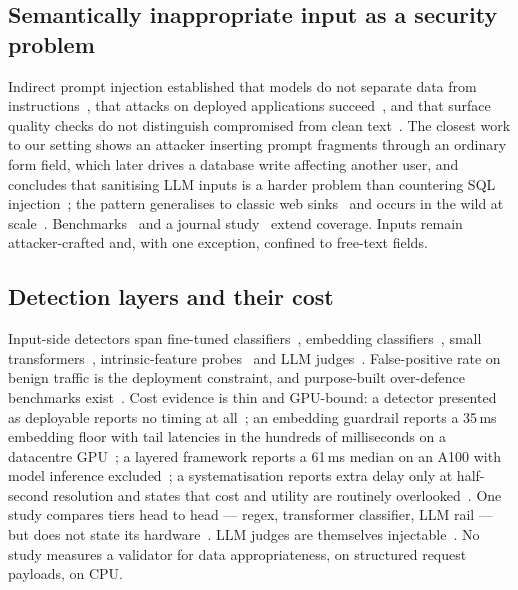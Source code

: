 \documentclass[conference]{IEEEtran}
\begin{document}
\subsection{Semantically inappropriate input as a security problem}
Indirect prompt injection established that models do not separate data from
instructions~\cite{greshake2023indirect}, that attacks on deployed applications
succeed~\cite{liu2023houyi,kaya2026chatbotplugins}, and that surface quality checks do not
distinguish compromised from clean text~\cite{liu2024formalizing}. The closest work to our setting
shows an attacker inserting prompt fragments through an ordinary form field, which later drives a
database write affecting another user, and concludes that sanitising LLM inputs is a harder problem
than countering SQL injection~\cite{pedro2025p2sql}; the pattern generalises to classic web
sinks~\cite{tsigkopoulos2026webexploitation} and occurs in the wild at
scale~\cite{khodayari2026ipiwild}. Benchmarks~\cite{yi2025bipia,evtimov2025wasp,liu2025wainjectbench}
and a journal study~\cite{milani2026ipi} extend coverage. Inputs remain attacker-crafted and, with
one exception, confined to free-text fields.

\subsection{Detection layers and their cost}
Input-side detectors span fine-tuned classifiers~\cite{jacob2025promptshield,liu2025datasentinel},
embedding classifiers~\cite{ayub2024embedding,ahmed2026reflexguard}, small
transformers~\cite{datta2025javelinguard,lakara2026fence}, intrinsic-feature
probes~\cite{shi2025promptarmor,akinrele2026regime} and LLM
judges~\cite{le2026llmjudge,rebedea2023nemo}. False-positive rate on benign traffic is the
deployment constraint, and purpose-built over-defence benchmarks
exist~\cite{li2024injecguard}. Cost evidence is thin and GPU-bound: a detector presented as
deployable reports no timing at all~\cite{jacob2025promptshield}; an embedding guardrail reports a
35\,ms embedding floor with tail latencies in the hundreds of milliseconds on a datacentre
GPU~\cite{ahmed2026reflexguard}; a layered framework reports a 61\,ms median on an A100 with model
inference excluded~\cite{saleem2026layered}; a systematisation reports extra delay only at
half-second resolution and states that cost and utility are routinely
overlooked~\cite{wang2026sokguardrails,zizzo2025guardrails,kumar2025nofreelunch}. One study compares
tiers head to head --- regex, transformer classifier, LLM rail --- but does not state its
hardware~\cite{maiorano2026tradeoffs}. LLM judges are themselves
injectable~\cite{shi2024judgeattack}. No study measures a validator for data appropriateness, on
structured request payloads, on CPU.
\end{document}
